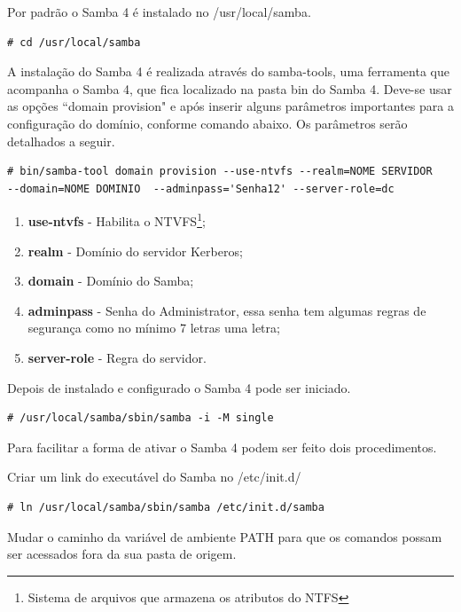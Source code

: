 Por padrão o Samba 4 é instalado no /usr/local/samba.\\

\begin{lstlisting}
# cd /usr/local/samba
\end{lstlisting}

A instalação do Samba 4 é realizada através do samba-tools, uma ferramenta que acompanha o Samba 4, que fica localizado na pasta bin do Samba 4. Deve-se usar as opções ``domain provision" e após inserir alguns parâmetros importantes para a configuração do domínio, conforme comando abaixo. Os parâmetros serão detalhados a seguir.\\

\begin{lstlisting}
# bin/samba-tool domain provision --use-ntvfs --realm=NOME SERVIDOR
--domain=NOME DOMINIO  --adminpass='Senha12' --server-role=dc
\end{lstlisting}

\begin{enumerate}
	\item \textbf{use-ntvfs} - Habilita o NTVFS\footnote[3]{Sistema de arquivos que armazena os atributos do NTFS};
	\item \textbf{realm} - Domínio do servidor Kerberos;
	\item \textbf{domain} - Domínio do Samba;
	\item \textbf{adminpass} - Senha do Administrator, essa senha tem algumas regras de segurança como no mínimo 7 letras uma letra;
	\item \textbf{server-role} - Regra do servidor.
\end{enumerate}

Depois de instalado e configurado o Samba 4 pode ser iniciado.\\

\begin{lstlisting}
# /usr/local/samba/sbin/samba -i -M single
\end{lstlisting}

Para facilitar a forma de ativar o Samba 4 podem ser feito dois procedimentos.

Criar um link do executável do Samba no /etc/init.d/\\

\begin{lstlisting}
# ln /usr/local/samba/sbin/samba /etc/init.d/samba
\end{lstlisting}

Mudar o caminho da variável de ambiente PATH para que os comandos possam ser acessados fora da sua pasta de origem.\\

